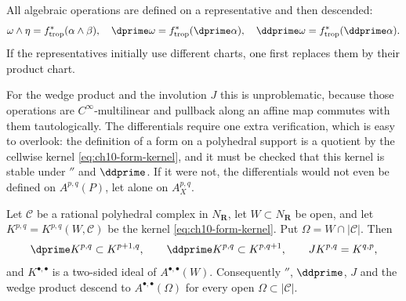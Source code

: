 All algebraic operations are defined on a representative and then descended:
\[
 \omega\wedge\eta=f_{\mathrm{trop}}^*(\alpha\wedge\beta),\quad
 \dprime\omega=f_{\mathrm{trop}}^*(\dprime\alpha),\quad
 \ddprime\omega=f_{\mathrm{trop}}^*(\ddprime\alpha).
\]
If the representatives initially use different charts, one first replaces
them by their product chart.

For the wedge product and the involution $J$ this is unproblematic, because
those operations are $C^\infty$-multilinear and pullback along an affine map
commutes with them tautologically.  The differentials require one extra
verification, which is easy to overlook: the definition of a form on a
polyhedral support is a quotient by the cellwise kernel
\eqref{eq:ch10-form-kernel}, and it must be checked that this kernel is
stable under $\dprime$ and $\ddprime$.  If it were not, the differentials
would not even be defined on $A^{p,q}(P)$, let alone on $A^{p,q}_X$.

\begin{lemma}
\label{lem:ch13-kernel-differential}
Let $\mathscr C$ be a rational polyhedral complex in $N_{\mathbf R}$, let
$W\subset N_{\mathbf R}$ be open, and let $K^{p,q}=K^{p,q}(W,\mathscr C)$ be
the kernel \eqref{eq:ch10-form-kernel}.  Put
$\Omega=W\cap|\mathscr C|$.  Then
\[
 \dprime K^{p,q}\subset K^{p+1,q},
 \qquad
 \ddprime K^{p,q}\subset K^{p,q+1},
 \qquad
 JK^{p,q}=K^{q,p},
\]
and $K^{\bullet,\bullet}$ is a two-sided ideal of $A^{\bullet,\bullet}(W)$.
Consequently $\dprime$, $\ddprime$, $J$ and the wedge product descend to
$A^{\bullet,\bullet}(\Omega)$ for every open $\Omega\subset|\mathscr C|$.
\end{lemma}

